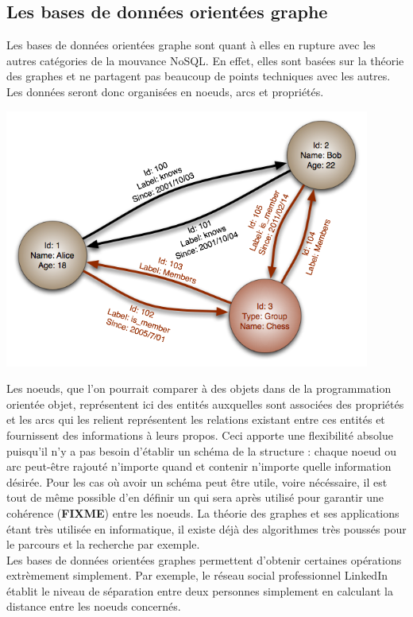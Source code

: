 \documentclass[11pt]{article}
\begin{document}
\subsection{Les bases de données orientées graphe}
Les bases de données orientées graphe sont quant à elles en rupture avec les autres catégories de la mouvance NoSQL. En effet, elles sont basées sur la théorie des graphes et ne partagent pas beaucoup de points techniques avec les autres. Les données seront donc organisées en noeuds, arcs et propriétés. \\
\begin{center}
  \includegraphics[width=12cm]{nosql_graph.png}
\end{center}
Les noeuds, que l'on pourrait comparer à des objets dans de la programmation orientée objet, représentent ici des entités auxquelles sont associées des propriétés et les arcs qui les relient représentent les relations existant entre ces entités et fournissent des informations à leurs propos. Ceci apporte une flexibilité absolue puisqu'il n'y a pas besoin d'établir un schéma de la structure : chaque noeud ou arc peut-être rajouté n'importe quand et contenir n'importe quelle information désirée. Pour les cas où avoir un schéma peut être utile, voire nécéssaire, il est tout de même possible d'en définir un qui sera après utilisé pour garantir une cohérence (\textbf{FIXME}) entre les noeuds. La théorie des graphes et ses applications étant très utilisée en informatique, il existe déjà des algorithmes très poussés pour le parcours et la recherche par exemple. \\
Les bases de données orientées graphes permettent d'obtenir certaines opérations extrèmement simplement. Par exemple, le réseau social professionnel LinkedIn établit le niveau de séparation entre deux personnes simplement en calculant la distance entre les noeuds concernés.
\end{document}
